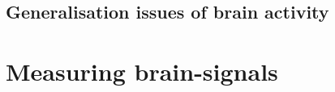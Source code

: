 
\subsection{Generalisation issues of brain activity}
\label{subsec:biomedical_signals_from_brain_generalisation}



\lipsum[1-3]


\section{Measuring brain-signals}
\label{sec:biomedical_signals_measuring}

\lipsum[1-2]





